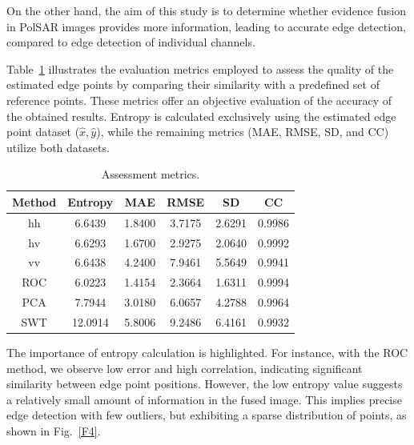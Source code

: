 \documentclass{article}
\begin{document}
On the other hand, the aim of this study is to determine whether evidence fusion in PolSAR images provides more information, leading to accurate edge detection, compared to edge detection of individual channels.\par
Table~\ref{tab_1} illustrates the evaluation metrics employed to assess the quality of the estimated edge points by comparing their similarity with a predefined set of reference points. These metrics offer an objective evaluation of the accuracy of the obtained results. Entropy is calculated exclusively using the estimated edge point dataset ($\hat{x},\hat{y}$), while the remaining metrics (MAE, RMSE, SD, and CC) utilize both datasets. 
\begin{table}[H]
  \centering
  \begin{tabular}{@{}cccccc@{}}
    \toprule
Method  &Entropy    & MAE        & RMSE       &SD       & CC \\
    \midrule
   hh  & 6.6439      & 1.8400       & 3.7175   & 2.6291   & 0.9986 \\
   hv  & 6.6293      & 1.6700       & 2.9275   & 2.0640   & 0.9992 \\
   vv  & 6.6438      & 4.2400      & 7.9461    & 5.5649   & 0.9941 \\
   ROC & 6.0223      & 1.4154      & 2.3664    & 1.6311    & 0.9994 \\
   PCA & 7.7944      & 3.0180       & 6.0657   & 4.2788  & 0.9964 \\
   SWT & 12.0914     & 5.8006      & 9.2486   & 6.4161  & 0.9932 \\
    \bottomrule
  \end{tabular}\vspace{-0.1cm}
  \caption{\small{Assessment metrics.}}
  \label{tab_1}
\end{table}\vspace{-0.3cm}
The importance of entropy calculation is highlighted. For instance, with the ROC method, we observe low error and high correlation, indicating significant similarity between edge point positions. However, the low entropy value suggests a relatively small amount of information in the fused image. This implies precise edge detection with few outliers, but exhibiting a sparse distribution of points, as shown in Fig.~\ref{F4}. \vspace{-0.45cm}
\end{document}
